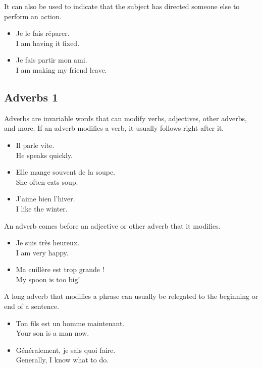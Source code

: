 It can also be used to indicate that the subject has directed someone else to perform an action.

\begin{itemize}
  \item  Je le fais r{\'e}parer. \\ I am having it fixed. 
  \item  Je fais partir mon ami. \\ I am making my friend leave.
\end{itemize}


\pagebreak
\subsection{Adverbs 1}

Adverbs are invariable words that can modify verbs, adjectives, other adverbs, and more.  If an adverb modifies a verb, it usually follows right after it.

\begin{itemize}
  \item  Il parle vite. \\ He speaks quickly.
  \item  Elle mange souvent de la soupe. \\ She often eats soup.
  \item  J'aime bien l'hiver. \\ I like the winter.
\end{itemize}

An adverb comes before an adjective or other adverb that it modifies.

\begin{itemize}
  \item  Je suis tr{\`e}s heureux. \\ I am very happy.
  \item  Ma cuill{\`e}re est trop grande ! \\ My spoon is too big!
\end{itemize}

A long adverb that modifies a phrase can usually be relegated to the beginning or end of a sentence.

\begin{itemize}
  \item  Ton fils est un homme maintenant. \\ Your son is a man now.
  \item  G{\'e}n{\'e}ralement, je sais quoi faire. \\ Generally, I know what to do.
\end{itemize}

